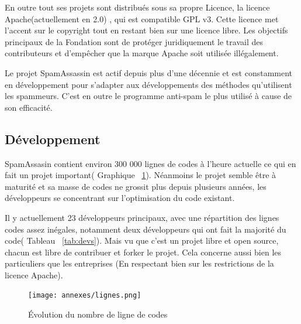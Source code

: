 \documentclass[a4paper,11pt]{article}
\begin{document}
En outre tout ses projets sont distribués sous sa propre Licence, la licence Apache(actuellement en 2.0) , qui est compatible GPL v3.
Cette licence met l’accent sur le copyright tout en restant bien sur une licence libre. Les objectifs principaux de la Fondation sont de protéger 
juridiquement le travail des contributeurs et d'empêcher que la marque Apache soit utilisée illégalement.

Le projet SpamAssassin est actif depuis plus d'une décennie et est constamment en développement 
pour s'adapter aux développements des méthodes qu'utilisent les spammeurs. C'est en outre le programme anti-spam le plus utilisé à cause de son efficacité.

\subsection{Développement}

SpamAssasin contient environ 300 000 lignes de codes à l'heure actuelle ce qui en fait un projet important( Graphique ~\ref{fig:code}).
Néanmoins le projet semble être à maturité et sa masse de codes ne grossit plus depuis plusieurs années, les développeurs se concentrant sur l'optimisation du code existant.

Il y actuellement 23 développeurs principaux, avec une répartition des lignes codes assez inégales, notamment deux développeurs qui ont fait la majorité du code( Tableau ~\ref{tab:devs}).
Mais vu que c'est un projet libre et open source, chacun est libre de contribuer et forker le projet. Cela concerne aussi 
bien les particuliers que les entreprises (En respectant bien sur les restrictions de la licence Apache).

\begin{figure}[h]
 \texttt{[image: annexes/lignes.png]}
  \caption{Évolution du nombre de ligne de codes}
  \label {fig:code}
\end{figure}
\end{document}
